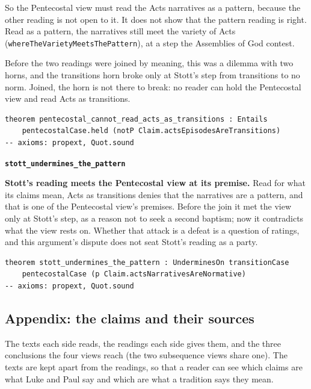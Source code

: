 \documentclass[11pt]{article}
\begin{document}
So the Pentecostal view must read the Acts narratives as a pattern, because the other reading is not open to it. It does not show that the pattern reading is right. Read as a pattern, the narratives still meet the variety of Acts (\texttt{where\allowbreak{}The\allowbreak{}Variety\allowbreak{}Meets\allowbreak{}The\allowbreak{}Pattern}), at a step the Assemblies of God contest.

Before the two readings were joined by meaning, this was a dilemma with two horns, and the transitions horn broke only at Stott’s step from transitions to no norm. Joined, the horn is not there to break: no reader can hold the Pentecostal view and read Acts as transitions.

{\small\begin{verbatim}
theorem pentecostal_cannot_read_acts_as_transitions : Entails
    pentecostalCase.held (notP Claim.actsEpisodesAreTransitions)
-- axioms: propext, Quot.sound
\end{verbatim}}
\par\medskip\noindent\textbf{\texttt{stott\_\allowbreak{}undermines\_\allowbreak{}the\_\allowbreak{}pattern}}\par\nobreak\noindent
\textbf{Stott’s reading meets the Pentecostal view at its premise.} Read for what its claims mean, Acts as transitions denies that the narratives are a pattern, and that is one of the Pentecostal view’s premises. Before the join it met the view only at Stott’s step, as a reason not to seek a second baptism; now it contradicts what the view rests on. Whether that attack is a defeat is a question of ratings, and this argument’s dispute does not seat Stott’s reading as a party.

{\small\begin{verbatim}
theorem stott_undermines_the_pattern : UnderminesOn transitionCase
    pentecostalCase (p Claim.actsNarrativesAreNormative)
-- axioms: propext, Quot.sound
\end{verbatim}}
\subsection*{Appendix: the claims and their sources}
The texts each side reads, the readings each side gives them, and the three conclusions the four views reach (the two subsequence views share one). The texts are kept apart from the readings, so that a reader can see which claims are what Luke and Paul say and which are what a tradition says they mean.
\end{document}
